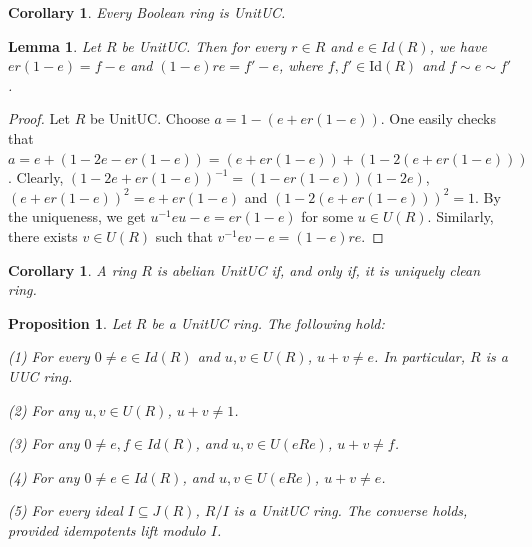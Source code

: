\documentclass[12pt]{amsart}
\newtheorem{proposition}[theorem]{Proposition}
\newtheorem{lemma}[theorem]{Lemma}
\newtheorem{corollary}[theorem]{Corollary}
\theoremstyle{definition}
\begin{document}
\begin{corollary}
    Every Boolean ring is   UnitUC.
\end{corollary}

\begin{lemma}
    Let $R$ be   UnitUC. Then for every $r \in R$ and $e \in Id(R)$, we have $er(1-e) = f - e$ and $(1-e)re = f'-e$, where $f, f' \in \text{Id}(R)$ and $f \sim e \sim f'$.
\end{lemma}
\begin{proof}
Let $R$ be  UnitUC. Choose $a = 1 - (e + er(1 - e))$. One easily checks that $a = e + (1 - 2e - er(1-e))= (e+er(1-e))+ (1-2(e+er(1-e)))$. Clearly, $(1- 2e+er(1-e))^{-1}= (1-er(1-e))(1-2e)$, $(e+er(1-e))^2=e+er(1-e)$ and $(1-2(e+er(1-e)))^2=1$. By the uniqueness, we get $u^{-1}eu-e = er(1-e)$ for some $u \in U(R)$.  Similarly, there exists $v \in U(R)$ such that $v^{-1}ev - e = (1-e)re$.
\end{proof}


\begin{corollary}\label{ex iso}
   A ring  $R$ is abelian    UnitUC if, and only if, it is  uniquely clean ring.
\end{corollary}


\begin{proposition}\label{impor lemma}
    Let $R$ be a   UnitUC ring. The following hold:

(1) For every $0\neq e \in Id(R)$ and $u, v \in U(R)$, $u+v \neq e$. In particular, $R$ is a UUC ring.

(2) For any $u, v \in U(R)$, $u+v \neq 1$.

(3) For any $0\neq e,f \in Id(R)$, and $u,v \in U(eRe)$, $ u+v\neq f$.

(4) For any $0\neq e \in Id(R)$, and $u,v \in U(eRe)$, $ u+v\neq e$.

(5) For every ideal $I \subseteq J(R)$, $R/I$ is a    UnitUC ring. The converse holds, provided idempotents lift modulo $I$.

\end{proposition}
\end{document}
